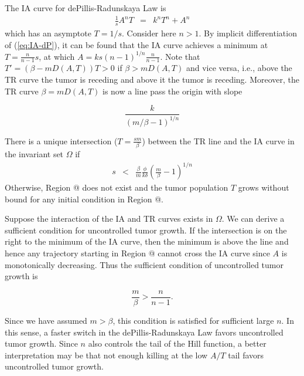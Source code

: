 \documentclass[review,authoryear]{elsarticle}
\makeatletter
\newcommand*{\rom}[1]{\expandafter\@slowromancap\romannumeral #1@}
\makeatother
\begin{document}
The IA curve for dePillis-Radunskaya Law is
\begin{eqnarray}
\frac{1}{s}A^{n}T & = & k^{n}T^{n}+A^{n}\label{eq:IA-dP}
\end{eqnarray}
which has an asymptote $T=1/s$. Consider here $n>1$. 
By implicit differentiation of (\ref{eq:IA-dP}), it can be found
that the IA curve achieves a minimum at $T=\frac{n}{n-1}s$, at which
$A=ks(n-1)^{1/n}\frac{n}{n-1}$. Note that $T'=(\beta-mD(A,T))T>0$
if $\beta>mD(A,T)$ and vice versa, i.e., above the TR curve the tumor
is receding and above it the tumor is receding. Moreover, the TR curve
$\beta=mD(A,T)$ is now a line pass the origin with slope 
\begin{linenomath*}
\[
\frac{k}{(m/\beta-1)^{1/n}}
\]
\end{linenomath*}
There is a unique intersection ($T=\frac{sm}{\beta}$) between the
TR line and the IA curve in the invariant set $\Omega$ if 
\begin{eqnarray}
s & < & \frac{\beta}{m}\frac{\phi}{k\delta}(\frac{m}{\beta}-1)^{1/n}\label{eq:s<}
\end{eqnarray}
  Otherwise, Region \rom{3} does not exist and the tumor population $T$ grows
without bound for any initial condition in Region \rom{2}. 

Suppose the interaction of the IA and TR curves exists in $\Omega$. We can derive
a sufficient condition for uncontrolled tumor growth. If the intersection
is on the right to the minimum of the IA curve, then the minimum is above the line
and hence any trajectory starting in Region \rom{2} cannot cross the IA curve
since $A$ is monotonically decreasing. Thus the sufficient condition
of uncontrolled tumor growth is 
\begin{linenomath*}
\begin{equation}
\frac{m}{\beta}>\frac{n}{n-1}.\label{eq:sneak-thru-cond}
\end{equation}
\end{linenomath*}
Since we have assumed $m>\beta$, this condition is satisfied for sufficient large $n$. In this sense, a faster switch in the dePillis-Radunskaya
Law favors uncontrolled tumor growth. Since $n$ also controls the tail of the Hill function, a better  interpretation may be that
not enough killing at the low $A/T$ tail favors uncontrolled tumor growth. 
\end{document}
